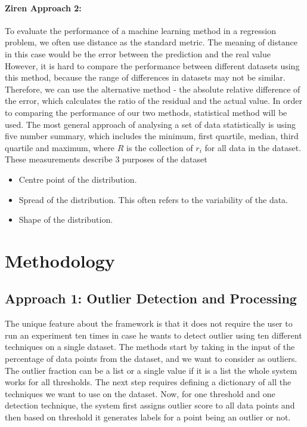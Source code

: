 \documentclass[runningheads]{llncs}
\begin{document}
\paragraph{Ziren Approach 2:}To evaluate the performance of a machine learning method in a regression problem, we often use distance as the standard metric. The meaning of distance in this case would be the error between the prediction and the real value
However, it is hard to compare the performance between different datasets using this method, because the range of differences in datasets may not be similar. Therefore, we can use the alternative method - the absolute relative difference of the error, which calculates the ratio of the residual and the actual value.
In order to comparing the performance of our two methods, statistical method will be used. The most general approach of analysing a set of data statistically is using five number summary, which includes the minimum, first quartile, median, third quartile and maximum, where $R$ is the collection of $r_i$ for all data in the dataset. These measurements describe 3 purposes of the dataset
\begin{itemize}
    \item Centre point of the distribution. 
    \item Spread of the distribution. This often refers to the variability of the data. 
    \item Shape of the distribution.
\end{itemize}

\section{Methodology}
\subsection{Approach 1: Outlier Detection and Processing}

The unique feature about the framework is that it does not require the user to run an experiment ten times in case he wants to detect outlier using ten different techniques on a single dataset. The methods start by taking in the input of the percentage of data points from the dataset, and we want to consider as outliers. The outlier fraction can be a list or a single value if it is a list the whole system works for all thresholds. The next step requires defining a dictionary of all the techniques we want to use on the dataset. Now, for one threshold and one detection technique, the system first assigns outlier score to all data points and then based on threshold it generates labels for a point being an outlier or not.
\end{document}
